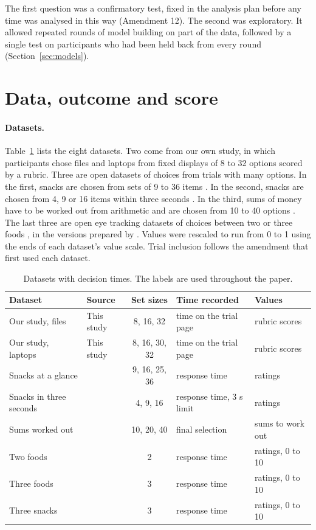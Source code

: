 \documentclass[11pt]{article}
\begin{document}
The first question was a confirmatory test, fixed in the analysis plan before any time was analysed in this way (Amendment 12). The second was exploratory. It allowed repeated rounds of model building on part of the data, followed by a single test on participants who had been held back from every round (Section~\ref{sec:models}).

\section{Data, outcome and score}
\label{sec:data}

\paragraph{Datasets.} Table~\ref{tab:data} lists the eight datasets. Two come from our own study, in which participants chose files and laptops from fixed displays of 8 to 32 options scored by a rubric. Three are open datasets of choices from trials with many options. In the first, snacks are chosen from sets of 9 to 36 items \citep{thomas2021}. In the second, snacks are chosen from 4, 9 or 16 items within three seconds \citep{reutskaja2011}. In the third, sums of money have to be worked out from arithmetic and are chosen from 10 to 40 options \citep{caplin2011}. The last three are open eye tracking datasets of choices between two or three foods \citep{krajbich2010,krajbich2011,folke2016}, in the versions prepared by \citet{thomas2019}. Values were rescaled to run from 0 to 1 using the ends of each dataset's value scale. Trial inclusion follows the amendment that first used each dataset.

\begin{table}[t]
\centering
\footnotesize
\setlength{\tabcolsep}{4pt}
\caption{Datasets with decision times. The labels are used throughout the paper.}
\label{tab:data}
\begin{tabular}{llcll}
\toprule
Dataset & Source & Set sizes & Time recorded & Values \\
\midrule
Our study, files & This study & 8, 16, 32 & time on the trial page & rubric scores \\
Our study, laptops & This study & 8, 16, 30, 32 & time on the trial page & rubric scores \\
Snacks at a glance & \citet{thomas2021} & 9, 16, 25, 36 & response time & ratings \\
Snacks in three seconds & \citet{reutskaja2011} & 4, 9, 16 & response time, 3 s limit & ratings \\
Sums worked out & \citet{caplin2011} & 10, 20, 40 & final selection & sums to work out \\
Two foods & \citet{krajbich2010} & 2 & response time & ratings, 0 to 10 \\
Three foods & \citet{krajbich2011} & 3 & response time & ratings, 0 to 10 \\
Three snacks & \citet{folke2016} & 3 & response time & ratings, 0 to 10 \\
\bottomrule
\end{tabular}
\end{table}
\end{document}

